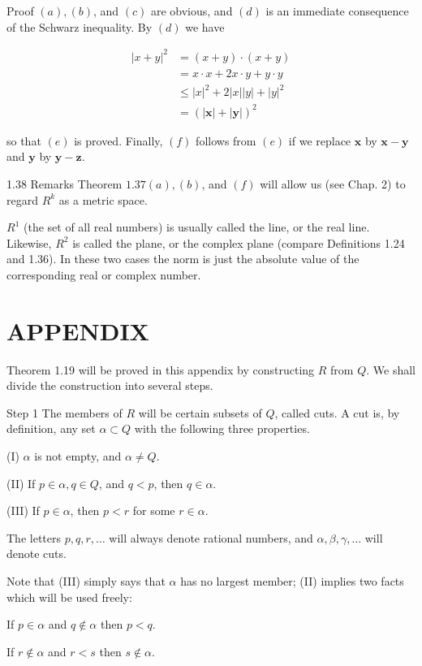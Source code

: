 \documentclass[10pt]{article}
\begin{document}
Proof $(a),(b)$, and $(c)$ are obvious, and $(d)$ is an immediate consequence of the Schwarz inequality. By $(d)$ we have

$$
\begin{aligned}
|x+y|^{2} & =(x+y) \cdot(x+y) \\
& =x \cdot x+2 x \cdot y+y \cdot y \\
& \leq|x|^{2}+2|x||y|+|y|^{2} \\
& =(|\mathbf{x}|+|\mathbf{y}|)^{2}
\end{aligned}
$$

so that $(e)$ is proved. Finally, $(f)$ follows from $(e)$ if we replace $\mathbf{x}$ by $\mathbf{x}-\mathbf{y}$ and $\mathbf{y}$ by $\mathbf{y}-\mathbf{z}$.

1.38 Remarks Theorem $1.37(a),(b)$, and $(f)$ will allow us (see Chap. 2) to regard $R^{k}$ as a metric space.

$R^{1}$ (the set of all real numbers) is usually called the line, or the real line. Likewise, $R^{2}$ is called the plane, or the complex plane (compare Definitions 1.24 and 1.36). In these two cases the norm is just the absolute value of the corresponding real or complex number.

\section{APPENDIX}
Theorem 1.19 will be proved in this appendix by constructing $R$ from $Q$. We shall divide the construction into several steps.

Step 1 The members of $R$ will be certain subsets of $Q$, called cuts. A cut is, by definition, any set $\alpha \subset Q$ with the following three properties.

(I) $\alpha$ is not empty, and $\alpha \neq Q$.

(II) If $p \in \alpha, q \in Q$, and $q<p$, then $q \in \alpha$.

(III) If $p \in \alpha$, then $p<r$ for some $r \in \alpha$.

The letters $p, q, r, \ldots$ will always denote rational numbers, and $\alpha, \beta, \gamma, \ldots$ will denote cuts.

Note that (III) simply says that $\alpha$ has no largest member; (II) implies two facts which will be used freely:

If $p \in \alpha$ and $q \notin \alpha$ then $p<q$.

If $r \notin \alpha$ and $r<s$ then $s \notin \alpha$.
\end{document}
